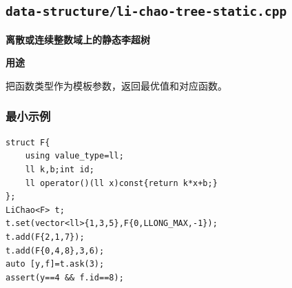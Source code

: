 \documentclass[UTF8,a4paper,10pt]{ctexart}
\newcommand{\TemplUsage}[1]{\textbf{用途}\par #1\par}
\begin{document}
\subsection{\texttt{data-structure/li-chao-tree-static.cpp}}
\textbf{离散或连续整数域上的静态李超树}\par
\TemplUsage{把函数类型作为模板参数，返回最优值和对应函数。}
\subsubsection*{最小示例}
\begin{lstlisting}
struct F{
    using value_type=ll;
    ll k,b;int id;
    ll operator()(ll x)const{return k*x+b;}
};
LiChao<F> t;
t.set(vector<ll>{1,3,5},F{0,LLONG_MAX,-1});
t.add(F{2,1,7});
t.add(F{0,4,8},3,6);
auto [y,f]=t.ask(3);
assert(y==4 && f.id==8);
\end{lstlisting}
\end{document}
